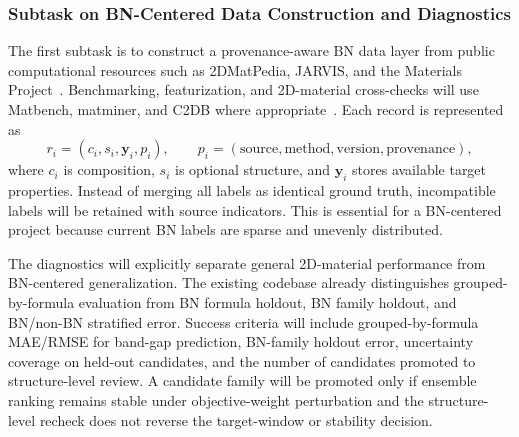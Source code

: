 \documentclass[12pt,a4paper]{article}
\begin{document}
\vspace{-10pt}
\subsubsection{Subtask on BN-Centered Data Construction and Diagnostics}
\label{subsubsec:data-diagnostics}
\vspace{-5pt}
The first subtask is to construct a provenance-aware BN data layer from public computational resources such as 2DMatPedia, JARVIS, and the Materials Project~\cite{zhou2019_2dmatpedia,choudhary2020_jarvis,jain2013_mp}. Benchmarking, featurization, and 2D-material cross-checks will use Matbench, matminer, and C2DB where appropriate~\cite{dunn2020_matbench,ward2018_matminer,haastrup2018_c2db}. Each record is represented as
\begin{equation}
  r_i=(c_i,s_i,\mathbf{y}_i,p_i),
  \qquad
  p_i=(\mathrm{source},\mathrm{method},\mathrm{version},\mathrm{provenance}),
\end{equation}
where $c_i$ is composition, $s_i$ is optional structure, and $\mathbf{y}_i$ stores available target properties. Instead of merging all labels as identical ground truth, incompatible labels will be retained with source indicators. This is essential for a BN-centered project because current BN labels are sparse and unevenly distributed.

The diagnostics will explicitly separate general 2D-material performance from BN-centered generalization. The existing codebase already distinguishes grouped-by-formula evaluation from BN formula holdout, BN family holdout, and BN/non-BN stratified error. Success criteria will include grouped-by-formula MAE/RMSE for band-gap prediction, BN-family holdout error, uncertainty coverage on held-out candidates, and the number of candidates promoted to structure-level review. A candidate family will be promoted only if ensemble ranking remains stable under objective-weight perturbation and the structure-level recheck does not reverse the target-window or stability decision.

\vspace{-10pt}
\end{document}

